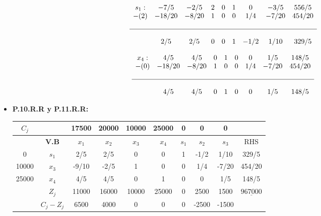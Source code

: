 \documentclass{templateNote}
\begin{document}
\begin{itemize}
    \begin{equation*}
        \begin{array}{ccccccccc}
            s_1: & -7/5 & -2/5 & 2 & 0 & 1 & 0 & -3/5 & 556/5 \\
            -(2) & -18/20 & -8/20 & 1 & 0 & 0 & 1/4 & -7/20 & 454/20 \\
            \\ \hline \\
            & 2/5 & 2/5 & 0 & 0 & 1 & -1/2 & 1/10 & 329/5
        \end{array}
    \end{equation*}
    
    \begin{equation*}
        \begin{array}{ccccccccc}
            x_4: & 4/5 & 4/5 & 0 & 1 & 0 & 0 & 1/5 & 148/5 \\
            -(0) & -18/20 & -8/20 & 1 & 0 & 0 & 1/4 & -7/20 & 454/20 \\
            \\ \hline \\
            & 4/5 & 4/5 & 0 & 1 & 0 & 0 & 1/5 & 148/5
        \end{array}
    \end{equation*}

    \item \textbf{P.10.R.R y P.11.R.R:}
    \begin{center}
        \begin{tabular}{|c|c|c|c|c|c|c|c|c|c|}
            \hline
            $C_j$ & & 17500 & 20000 & 10000 & 25000 & 0 & 0 & 0 & \\ \hline
            & \textbf{V.B} & $x_1$ & $x_2$ & $x_3$ & $x_4$ & $s_1$ & $s_2$ & $s_3$ & RHS \\ \hline
            0 & $s_1$ & 2/5 & 2/5 & 0 & 0 & 1 & -1/2 & 1/10 & 329/5 \\
            10000 & $x_3$ & -9/10 & -2/5 & 1 & 0 & 0 & 1/4 & -7/20 & 454/20 \\
            25000 & $x_4$ & 4/5 & 4/5 & 0 & 1 & 0 & 0 & 1/5 & 148/5 \\ \hline
            & $Z_j$ & 11000 & 16000 & 10000 & 25000 & 0 & 2500 & 1500 & $\underline{967000}$ \\ \hline
            & $C_j - Z_j$ & 6500 & 4000 & 0 & 0 & 0 & -2500 & -1500 & \\ \hline
        \end{tabular}
    \end{center}
    

\end{itemize}
\end{document}
